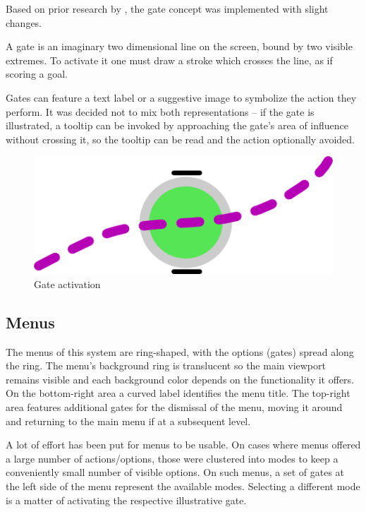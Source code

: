Based on prior research by \cite{CROSSY}, the gate concept was implemented with slight changes.

A gate is an imaginary two dimensional line on the screen, bound by two visible extremes.
To activate it one must draw a stroke which crosses the line, as if scoring a goal.

Gates can feature a text label or a suggestive image to symbolize the action they perform.
It was decided not to mix both representations -- if the gate is illustrated, a tooltip can be invoked
by approaching the gate's area of influence without crossing it, so the tooltip can be read and the action optionally avoided.

\begin{figure}[ht]
	\centering
		\includegraphics{gfx/activation.png}
		\caption{Gate activation}
	\label{fig:activation}
\end{figure}



\subsection{Menus}

The menus of this system are ring-shaped, with the options (gates) spread along the ring.
The menu's background ring is translucent so the main viewport remains visible and each background color
depends on the functionality it offers.
On the bottom-right area a curved label identifies the menu title.
The top-right area features additional gates for the dismissal of the menu, moving it around and
returning to the main menu if at a subsequent level.

A lot of effort has been put for menus to be usable. On cases where menus offered a large number of actions/options,
those were clustered into modes to keep a conveniently small number of visible options.
On such menus, a set of gates at the left side of the menu represent the available modes.
Selecting a different mode is a matter of activating the respective illustrative gate.

